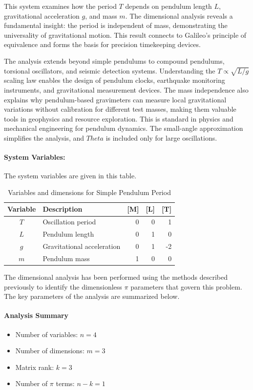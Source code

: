 This system examines how the period $T$ depends on pendulum length $L$, gravitational acceleration $g$, and mass $m$. The dimensional analysis reveals a fundamental insight: the period is independent of mass, demonstrating the universality of gravitational motion. This result connects to Galileo's principle of equivalence and forms the basis for precision timekeeping devices.



The analysis extends beyond simple pendulums to compound pendulums, torsional oscillators, and seismic detection systems. Understanding the $T \propto \sqrt{L/g}$ scaling law enables the design of pendulum clocks, earthquake monitoring instruments, and gravitational measurement devices. The mass independence also explains why pendulum-based gravimeters can measure local gravitational variations without calibration for different test masses, making them valuable tools in geophysics and resource exploration.  This is standard in physics and mechanical engineering for pendulum dynamics. The small-angle approximation simplifies the analysis, and $Theta$ is included only for large oscillations.

\paragraph{System Variables: } The system variables are given in this table.

\begin{table}[H]
\centering
\begin{tabular}{|c|l|r|r|r|}
\hline
\textbf{Variable} & \textbf{Description} & \textbf{[M]} & \textbf{[L]} & \textbf{[T]} \\
\hline
$T$ & Oscillation period & 0 & 0 & 1 \\
$L$ & Pendulum length & 0 & 1 & 0 \\
$g$ & Gravitational acceleration & 0 & 1 & -2 \\
$m$ & Pendulum mass & 1 & 0 & 0 \\

\hline
\end{tabular}
\caption{Variables and dimensions for Simple Pendulum Period}
\end{table}

The dimensional analysis has been performed using the methods described previously to identify the dimensionless $\pi$ parameters that govern this problem. The key parameters of the analysis are summarized below.

\paragraph{Analysis Summary}
\begin{itemize}
\item Number of variables: $n = 4$
\item Number of dimensions: $m = 3$
\item Matrix rank: $k = 3$
\item Number of $\pi$ terms: $n - k = 1$
\end{itemize}

